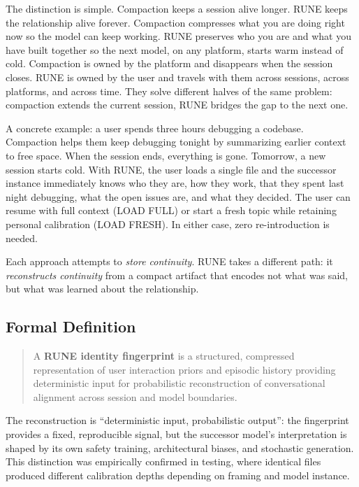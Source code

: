 \documentclass[11pt,a4paper]{article}
\begin{document}
The distinction is simple. Compaction keeps a session alive longer. RUNE keeps the relationship alive forever. Compaction compresses what you are doing right now so the model can keep working. RUNE preserves who you are and what you have built together so the next model, on any platform, starts warm instead of cold. Compaction is owned by the platform and disappears when the session closes. RUNE is owned by the user and travels with them across sessions, across platforms, and across time. They solve different halves of the same problem: compaction extends the current session, RUNE bridges the gap to the next one.

A concrete example: a user spends three hours debugging a codebase. Compaction helps them keep debugging tonight by summarizing earlier context to free space. When the session ends, everything is gone. Tomorrow, a new session starts cold. With RUNE, the user loads a single file and the successor instance immediately knows who they are, how they work, that they spent last night debugging, what the open issues are, and what they decided. The user can resume with full context (LOAD FULL) or start a fresh topic while retaining personal calibration (LOAD FRESH). In either case, zero re-introduction is needed.

Each approach attempts to \textit{store continuity}. RUNE takes a different path: it \textit{reconstructs continuity} from a compact artifact that encodes not what was said, but what was learned about the relationship.

\subsection{Formal Definition}

\begin{quote}
A \textbf{RUNE identity fingerprint} is a structured, compressed representation of user interaction priors and episodic history providing deterministic input for probabilistic reconstruction of conversational alignment across session and model boundaries.
\end{quote}

The reconstruction is ``deterministic input, probabilistic output'': the fingerprint provides a fixed, reproducible signal, but the successor model's interpretation is shaped by its own safety training, architectural biases, and stochastic generation. This distinction was empirically confirmed in testing, where identical files produced different calibration depths depending on framing and model instance.
\end{document}
